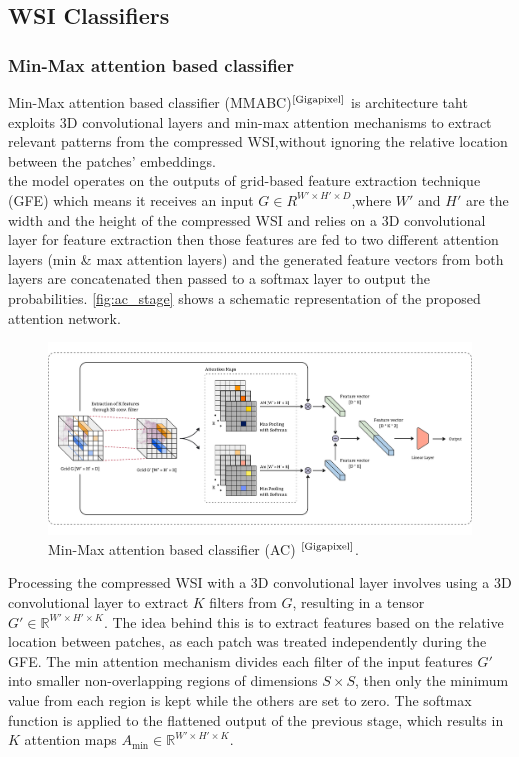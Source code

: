 \documentclass[
11pt, %
english, %
singlespacing, %
headsepline, %
]{project_structure}
\begin{document}
\subsection{\acrshort{WSI} Classifiers}

\subsubsection{Min-Max attention based classifier}
\noindent Min-Max attention based classifier (\acrshort{MMABC})$^\text{\cite{Gigapixel}}$ is architecture taht exploits 3D convolutional layers and min-max attention mechanisms to extract relevant patterns from the compressed \acrshort{WSI},without ignoring the relative location between the patches' embeddings.\\

\noindent the model operates on the outputs of grid-based feature extraction technique (\acrshort{GFE}) which means it receives an input $G \in R^{W' \times H' \times D}$,where $W'$ and $H'$ are the width and the height of the compressed \acrshort{WSI} and relies on a 3D convolutional layer for feature extraction then those features are fed to two different attention layers (min \& max attention layers) and the generated feature vectors from both layers are concatenated then passed to a softmax layer to output the probabilities. \autoref{fig:ac_stage} shows a schematic representation of the proposed attention
network.\\

\begin{figure}[H]
    \centering
    \includegraphics[width=\textwidth]{figures/ABNN_methods/AC.png}
    \caption{Min-Max attention based classifier (\acrshort{AC}) $^{\text{\cite{Gigapixel}}}$.}
    \label{fig:ac_stage}
\end{figure}

\noindent Processing the compressed WSI with a 3D convolutional layer involves using a 3D convolutional layer to extract $K$ filters from $G$, resulting in a tensor $G' \in \mathbb{R}^{W' \times H' \times K}$. The idea behind this is to extract features based on the relative location between patches, as each patch was treated independently during the GFE. The min attention mechanism divides each filter of the input features $G'$ into smaller non-overlapping regions of dimensions $S \times S$, then only the minimum value from each region is kept while the others are set to zero. The softmax function is applied to the flattened output of the previous stage, which results in $K$ attention maps $A_{\text{min}} \in \mathbb{R}^{W' \times H' \times K}$.\\
\end{document}
